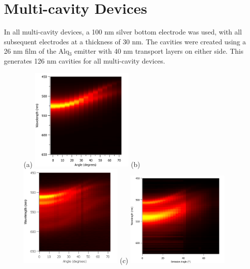 \documentclass{report}
\begin{document}
    \section{Multi-cavity Devices} \label{n>1}
        In all multi-cavity devices, a 100 nm silver bottom electrode was used, with all subsequent electrodes at a thickness of 30 nm. The cavities were created using a 26 nm film of the Alq$_3$ emitter with 40 nm transport layers on either side. This generates 126 nm cavities for all multi-cavity devices.
		\begin{figure}[h!]
            \centering
            (a)
            \includegraphics[width=0.45\textwidth]{images/n2_heatmap.png}
            (b)
            \includegraphics[width=0.45\textwidth]{images/n3_heatmap.png}
            \newline
            (c)
            \includegraphics[width=0.45\textwidth]{images/n4_heatmap.pdf}

\end{figure}
\end{document}
